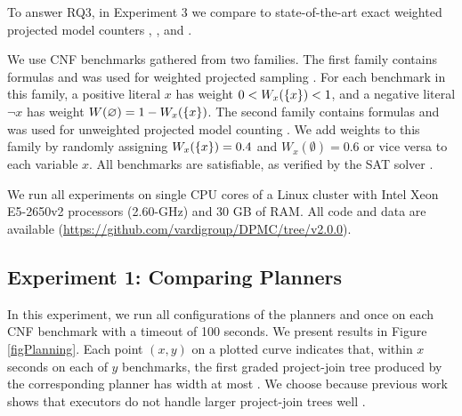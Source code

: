 To answer RQ3, in Experiment 3 we compare \procount{} to state-of-the-art exact weighted projected model counters \dfp{} \cite{lagniez2019recursive}, \projmc{} \cite{lagniez2019recursive}, and \ssat{} \cite{lee2017solving}.


We use \benchmarks{} CNF benchmarks gathered from two families.
The first family contains \wapsBenchmarks{} formulas and was used for weighted projected sampling \cite{gupta2019waps}.
For each benchmark in this family, a positive literal $x$ has weight $0 < W_x(\left\{ x \right\}) < 1$, and a negative literal $\neg x$ has weight $W(\varnothing) = 1 - W_x(\left\{ x \right\})$.
The second family contains \birdBenchmarks{} formulas and was used for unweighted projected model counting \cite{soos2019bird}.
We add weights to this family by randomly assigning $W_x(\left\{ x \right\}) = 0.4$ and $W_x(\emptyset) = 0.6$ or vice versa to each variable $x$.
All \benchmarks{} benchmarks are satisfiable, as verified by the SAT solver \sat{} \cite{soos2009extending}.

We run all experiments on single CPU cores of a Linux cluster with Intel Xeon E5-2650v2 processors (2.60-GHz) and 30 GB of RAM.
All code and data are available (\url{https://github.com/vardigroup/DPMC/tree/v2.0.0}).

\noindent


\subsection{Experiment 1: Comparing Planners}

In this experiment, we run all configurations of the planners \Lg{} and \htb{} once on each CNF benchmark with a timeout of 100 seconds.
We present results in Figure \ref{figPlanning}.
Each point $(x, y)$ on a plotted curve indicates that, within $x$ seconds on each of $y$ benchmarks, the first graded project-join tree produced by the corresponding planner has width at most \maxWidth{}.
We choose \maxWidth{} because previous work shows that executors do not handle larger project-join trees well \cite{DDV19,dudek2020dpmc}. %

